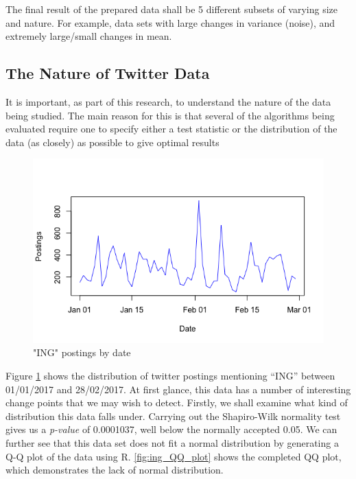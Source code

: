\documentclass{uvamscse}	%
\begin{document}

The final result of the prepared data shall be 5 different subsets of varying size and nature. For example, data sets with large changes in variance (noise), and extremely large/small changes in mean.

\subsection{The Nature of Twitter Data}

It is important, as part of this research, to understand the nature of the data being studied. The main reason for this is that several of the algorithms being evaluated require one to specify either a test statistic or the distribution of the data (as closely) as possible to give optimal results

\begin{figure}[hbt]
	\includegraphics[scale=0.5]{figures/ing-totals-full.png}
	\centering
	\caption{"ING" postings by date}
	\label{fig:ing_totals_graph}
\end{figure}

Figure \ref{fig:ing_totals_graph} shows the distribution of twitter postings mentioning ``ING'' between 01/01/2017 and 28/02/2017. At first glance, this data has a number of interesting change points that we may wish to detect. Firstly, we shall examine what kind of distribution this data falls under. Carrying out the Shapiro-Wilk normality test gives us a \emph{p-value} of 0.0001037, well below the normally accepted 0.05. We can further see that this data set does not fit a normal distribution by generating a Q-Q plot of the data using R. \ref{fig:ing_QQ_plot} shows the completed QQ plot, which demonstrates the lack of normal distribution.
\end{document}
